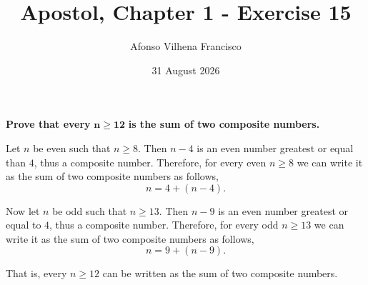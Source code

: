 \documentclass{article}
\title{Apostol, Chapter 1 - Exercise 15}
\author{Afonso Vilhena Francisco}
\date{31 August 2026}
\begin{document}
\maketitle

\textbf{Prove that every} $\mathbf{n \geq 12}$ \textbf{is the sum of two composite numbers.}

\vspace{0.5cm}

Let $n$ be even such that $n \geq 8$. Then $n-4$ is an even number greatest or equal than $4$, thus a composite number. Therefore, for every even $n \geq 8$ we can write it as the sum of two composite numbers as follows, 
$$n=4+(n-4).$$

Now let $n$ be odd such that $n \geq 13$. Then $n-9$ is an even number greatest or equal to $4$, thus a composite number. Therefore, for every odd $n \geq 13$ we can write it as the sum of two composite numbers as follows,
$$n=9+(n-9).$$

That is, every $n\geq 12$ can be written as the sum of two composite numbers.
\end{document}
